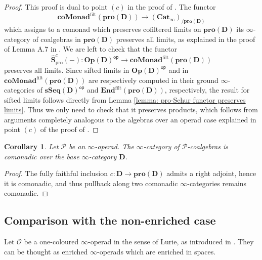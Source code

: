 \documentclass{proc-l}
\theoremstyle{plain}
\newtheorem{corollary}[{theorem}]{Corollary}
\theoremstyle{definition}
\theoremstyle{remark}
\begin{document}
\begin{proof}
This proof is dual to point $(c)$ in the proof of \cite[Theorem 5.2]{heuts2024}. The functor
\[
\mathbf{coMonad}^{\mathrm{filt}}(\mathbf{pro}(\mathbf{D})) \longrightarrow (\mathbf{Cat}_\infty)_{/\mathbf{pro}(\mathbf{D})}
\]
which assigns to a comonad which preserves cofiltered limits on $\mathbf{pro}(\mathbf{D})$ its $\infty$-category of coalgebras in $\mathbf{pro}(\mathbf{D})$ preserves all limits, as explained in the proof of Lemma A.7 in \cite{heuts2024}. We are left to check that the functor
\[
\widehat{\mathbf{S}}^c_{\mathrm{pro}}(-): \mathbf{Op}(\mathbf{D})^{\mathsf{op}} \longrightarrow \mathbf{coMonad}^{\mathrm{filt}}(\mathbf{pro}(\mathbf{D}))
\]
preserves all limits. Since sifted limits in $\mathbf{Op}(\mathbf{D})^{\mathsf{op}}$ and in $\mathbf{coMonad}^{\mathrm{filt}}(\mathbf{pro}(\mathbf{D}))$ are respectively computed in their ground $\infty$-categories of $\mathbf{sSeq}(\mathbf{D})^{\mathsf{op}}$ and $\mathbf{End}^{\mathrm{filt}}(\mathbf{pro}(\mathbf{D}))$, respectively, the result for sifted limits follows directly from Lemma \ref{lemma: pro-Schur functor preserves limits}. Thus we only need to check that it preserves products, which follows from arguments completely analogous to the algebras over an operad case explained in point $(c)$ of the proof of \cite[Theorem 5.2]{heuts2024}.
\end{proof}

\begin{corollary}%
\label{Corollary:3.17}Let $\mathscr{P}$ be an $\infty$-operad. The $\infty$-category of $\mathscr{P}$-coalgebras is comonadic over the base $\infty$-category $\mathbf{D}$.
\end{corollary}

\begin{proof}
The fully faithful inclusion $c: \mathbf{D} \longrightarrow \mathbf{pro}(\mathbf{D})$ admits a right adjoint, hence it is comonadic, and thus pullback along two comonadic $\infty$-categories remains comonadic.
\end{proof}

\subsection{Comparison with the non-enriched case}%
\label{Section:3.4}
Let $\mathscr{O}$ be a one-coloured $\infty$-operad in the sense of Lurie, as introduced in \cite[Chapter 2]{HigherAlgebra}. They can be thought as enriched $\infty$-operads which are enriched in spaces.
\end{document}
